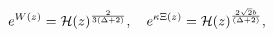 \begin{equation}
e^{W(z)} = {\cal H}(z)^{\frac{2}{3(\Delta+2)}},\quad e^{\kappa \Xi(z)}=
{\cal H}(z)^{\frac{2 \sqrt{2}b}{(\Delta+2)}},
\end{equation}

